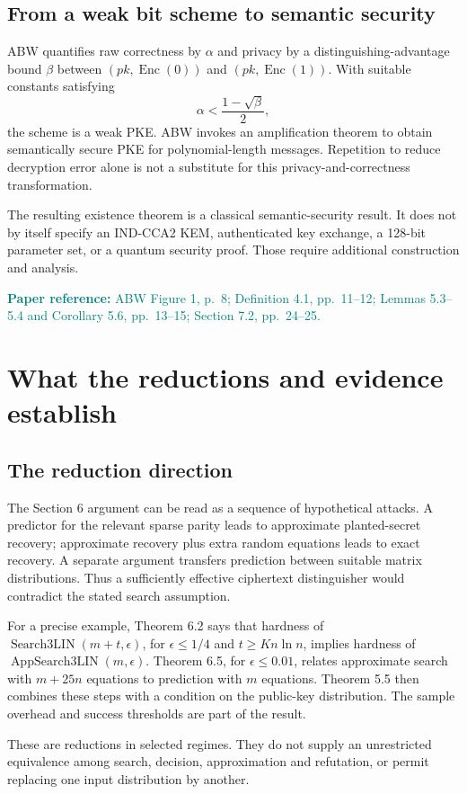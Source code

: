 \documentclass[11pt,a4paper]{article}
\newcommand{\Search}{\operatorname{Search3LIN}}
\newcommand{\App}{\operatorname{AppSearch3LIN}}
\newcommand{\readref}[1]{\textcolor{teal}{\small\textbf{Paper reference:} #1}}
\begin{document}
\subsection{From a weak bit scheme to semantic security}
ABW quantifies raw correctness by $\alpha$ and privacy by a distinguishing-advantage bound $\beta$ between $(pk,\operatorname{Enc}(0))$ and $(pk,\operatorname{Enc}(1))$. With suitable constants satisfying
\[
 \alpha<\frac{1-\sqrt\beta}{2},
\]
the scheme is a weak PKE. ABW invokes an amplification theorem to obtain semantically secure PKE for polynomial-length messages. Repetition to reduce decryption error alone is not a substitute for this privacy-and-correctness transformation.

The resulting existence theorem is a classical semantic-security result. It does not by itself specify an IND-CCA2 KEM, authenticated key exchange, a 128-bit parameter set, or a quantum security proof. Those require additional construction and analysis.

\readref{ABW Figure 1, p.~8; Definition 4.1, pp.~11--12; Lemmas 5.3--5.4 and Corollary 5.6, pp.~13--15; Section 7.2, pp.~24--25.}

\section{What the reductions and evidence establish}\label{sec:evidence}
\subsection{The reduction direction}
The Section 6 argument can be read as a sequence of hypothetical attacks. A predictor for the relevant sparse parity leads to approximate planted-secret recovery; approximate recovery plus extra random equations leads to exact recovery. A separate argument transfers prediction between suitable matrix distributions. Thus a sufficiently effective ciphertext distinguisher would contradict the stated search assumption.

For a precise example, Theorem 6.2 says that hardness of $\Search(m+t,\epsilon)$, for $\epsilon\leq1/4$ and $t\geq K n\ln n$, implies hardness of $\App(m,\epsilon)$. Theorem 6.5, for $\epsilon\leq0.01$, relates approximate search with $m+25n$ equations to prediction with $m$ equations. Theorem 5.5 then combines these steps with a condition on the public-key distribution. The sample overhead and success thresholds are part of the result.

These are reductions in selected regimes. They do not supply an unrestricted equivalence among search, decision, approximation and refutation, or permit replacing one input distribution by another.
\end{document}
